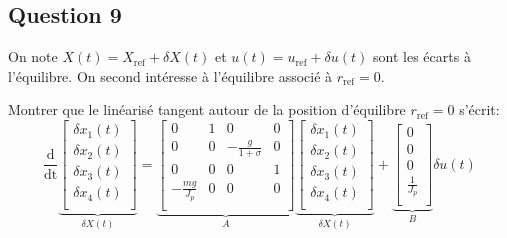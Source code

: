 \documentclass[class=article, crop=false]{standalone}
\begin{document}
\subsection{Question 9}
On note $X(t) = X_{\text{ref}} + \delta X(t)$ et $u(t) = u_{\text{ref}} + \delta u(t)$ sont les écarts à l'équilibre. On second intéresse à l'équilibre associé à $r_{\text{ref}} = 0$.
\begin{exercise}
    Montrer que le linéarisé tangent autour de la position d'équilibre $r_{\text{ref}} = 0$ s'écrit:
    \begin{equation}
        \frac{\text{d}}{\text{dt}} 
        \underbrace{
        \begin{bmatrix}
            \delta x_{1}(t)\\
            \delta x_{2}(t)\\
            \delta x_{3}(t)\\
            \delta x_{4}(t)\\
        \end{bmatrix}}_{\delta X(t)}
        =
        \underbrace{
            \begin{bmatrix}
            0 & 1 & 0 & 0\\
            0 & 0 & -\frac{g}{1 + \sigma} & 0\\
            0 & 0 & 0 & 1\\
            -\frac{mg}{J_p} & 0 & 0 & 0\\
        \end{bmatrix}}_{A}
        \underbrace{
        \begin{bmatrix}
            \delta x_{1}(t)\\
            \delta x_{2}(t)\\
            \delta x_{3}(t)\\
            \delta x_{4}(t)\\
        \end{bmatrix}}_{\delta X(t)}
        +
        \underbrace{
            \begin{bmatrix}
            0\\
            0\\
            0\\
            \frac{1}{J_p}\\
        \end{bmatrix}}_{B}
        \delta u(t)
    \end{equation}
\end{exercise}
\end{document}
